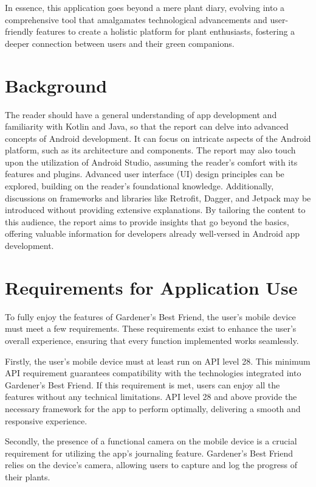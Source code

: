 \documentclass{sigchi}
\begin{document}
In essence, this application goes beyond a mere plant diary, evolving into a comprehensive tool that amalgamates technological advancements and user-friendly features to create a holistic platform for plant enthusiasts, fostering a deeper connection between users and their green companions.

\section{Background}


The reader should have a general understanding of app development and familiarity with Kotlin and Java, so that the report can delve into advanced concepts of Android development. It can focus on intricate aspects of the Android platform, such as its architecture and components. The report may also touch upon the utilization of Android Studio, assuming the reader's comfort with its features and plugins. Advanced user interface (UI) design principles  can be explored, building on the reader's foundational knowledge. Additionally, discussions on frameworks and libraries like Retrofit, Dagger, and Jetpack may be introduced without providing extensive explanations. By tailoring the content to this audience, the report aims to provide insights that go beyond the basics, offering valuable information for developers already well-versed in Android app development.

\section{Requirements for Application Use}
To fully enjoy the features of Gardener's Best Friend, the user's mobile device must meet a few requirements. These requirements exist to enhance the user's overall experience, ensuring that every function implemented works seamlessly.

Firstly, the user's mobile device must at least run on API level 28. This minimum API requirement guarantees compatibility with the technologies integrated into Gardener's Best Friend. If this requirement is met, users can enjoy all the features without any technical limitations. API level 28 and above provide the necessary framework for the app to perform optimally, delivering a smooth and responsive experience.

Secondly, the presence of a functional camera on the mobile device is a crucial requirement for utilizing the app's journaling feature. Gardener's Best Friend relies on the device's camera, allowing users to capture and log the progress of their plants.
\end{document}

